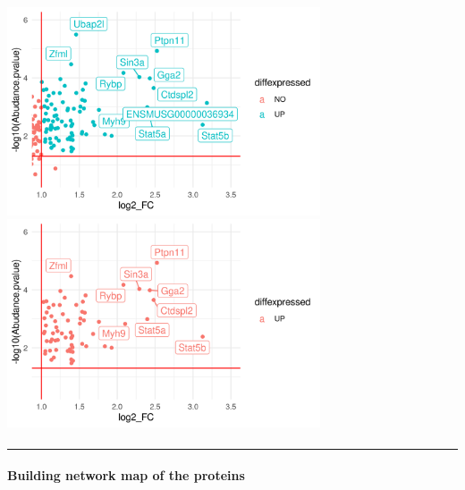 \documentclass[
]{article}
\begin{document}
\hypertarget{volcano-of-data_phospho-before-filterzoomed-in-volcano-from-more-phosphorylated-after-filter}{%
\paragraph{\texorpdfstring{\protect\includegraphics[width=3.64583in,height=\textheight]{images/Zoomed_in_Volcano-01.png}\protect\includegraphics[width=3.64583in,height=\textheight]{images/Zoomed_in_Volcano_for_more_phosphrylated_after_qc_and_filter.png}}{Volcano of data\_phospho before filterZoomed in Volcano from more phosphorylated after filter}}\label{volcano-of-data_phospho-before-filterzoomed-in-volcano-from-more-phosphorylated-after-filter}}

\begin{center}\rule{0.5\linewidth}{0.5pt}\end{center}

\hypertarget{section}{%
\paragraph{}\label{section}}

\hypertarget{building-network-map-of-the-proteins}{%
\paragraph{Building network map of the
proteins}\label{building-network-map-of-the-proteins}}
\end{document}
